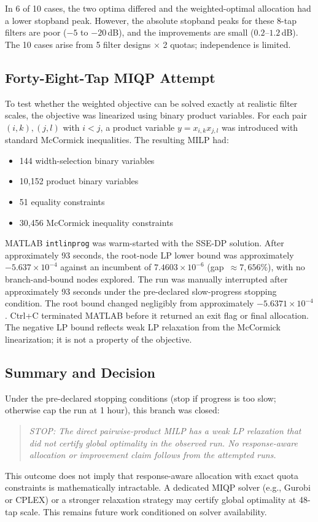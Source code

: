 In 6 of 10 cases, the two optima differed and the weighted-optimal
allocation had a lower stopband peak. However, the absolute stopband
peaks for these 8-tap filters are poor ($-5$ to $-20$\,dB), and the
improvements are small ($0.2$--$1.2$\,dB). The 10 cases arise from 5
filter designs $\times$ 2 quotas; independence is limited.

\subsection{Forty-Eight-Tap MIQP Attempt}

To test whether the weighted objective can be solved exactly at realistic
filter scales, the objective was linearized using binary product
variables. For each pair $(i,k),(j,l)$ with $i<j$, a product variable
$y = x_{i,k} x_{j,l}$ was introduced with standard McCormick
inequalities. The resulting MILP had:
\begin{itemize}
\item 144 width-selection binary variables
\item 10,152 product binary variables
\item 51 equality constraints
\item 30,456 McCormick inequality constraints
\end{itemize}

MATLAB \texttt{intlinprog} was warm-started with the SSE-DP solution.
After approximately 93 seconds, the root-node LP lower bound was
approximately $-5.637 \times 10^{-4}$ against an incumbent of
$7.4603 \times 10^{-6}$ (gap~$\approx 7{,}656\%$), with no
branch-and-bound nodes explored. The run was manually interrupted after
approximately 93 seconds under the pre-declared slow-progress stopping
condition. The root bound changed negligibly from approximately
$-5.6371\times10^{-4}$. Ctrl+C terminated MATLAB before it returned an
exit flag or final allocation. The negative LP bound reflects weak LP
relaxation from the McCormick linearization; it is not a property of the
objective.

\subsection{Summary and Decision}

Under the pre-declared stopping conditions (stop if progress is too slow;
otherwise cap the run at 1 hour), this branch was closed:

\begin{quote}
\textit{STOP: The direct pairwise-product MILP has a weak LP relaxation
that did not certify global optimality in the observed run.
No response-aware allocation or improvement claim follows from the
attempted runs.}
\end{quote}

This outcome does not imply that response-aware allocation with exact
quota constraints is mathematically intractable. A dedicated MIQP solver
(e.g., Gurobi or CPLEX) or a stronger relaxation strategy may
certify global optimality at 48-tap scale. This remains future work
conditioned on solver availability.
